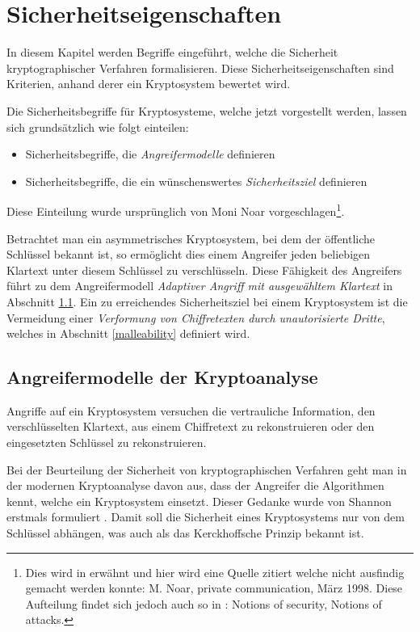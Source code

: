 \chapter{Sicherheitseigenschaften}
\label{SK}

In diesem Kapitel werden Begriffe eingeführt, welche die Sicherheit kryptographischer Verfahren formalisieren. Diese Sicherheitseigenschaften sind Kriterien, anhand derer ein Kryptosystem bewertet wird.

Die Sicherheitsbegriffe für Kryptosysteme, welche jetzt vorgestellt werden, lassen sich grundsätzlich wie folgt einteilen:

\begin{itemize}
	\item Sicherheitsbegriffe, die \textit{Angreifermodelle} definieren 
	\item Sicherheitsbegriffe, die ein wünschenswertes \textit{Sicherheitsziel} definieren
\end{itemize}

Diese Einteilung wurde ursprünglich von Moni Noar vorgeschlagen\footnote{Dies wird in \cite{bellare1998relations} erwähnt und hier wird eine Quelle zitiert welche nicht ausfindig gemacht werden konnte: M. Noar, private communication, März 1998. Diese Aufteilung findet sich jedoch auch so in \cite[p.289]{smart2003}: Notions of security, Notions of attacks.}.

Betrachtet man ein asymmetrisches Kryptosystem, bei dem der öffentliche Schlüssel bekannt ist, so ermöglicht dies einem Angreifer jeden beliebigen Klartext unter diesem Schlüssel zu verschlüsseln. Diese Fähigkeit des Angreifers führt zu dem Angreifermodell \textit{Adaptiver Angriff mit ausgewähltem Klartext} in Abschnitt \ref{angreifermodelle}. Ein zu erreichendes Sicherheitsziel bei einem Kryptosystem ist die Vermeidung einer \textit{Verformung von Chiffretexten durch unautorisierte Dritte}, welches in Abschnitt \ref{malleability} definiert wird.

\section{Angreifermodelle der Kryptoanalyse}
\label{angreifermodelle}

Angriffe auf ein Kryptosystem versuchen die vertrauliche Information, den verschlüsselten Klartext, aus einem Chiffretext zu rekonstruieren oder den eingesetzten Schlüssel zu rekonstruieren.

Bei der Beurteilung der Sicherheit von kryptographischen Verfahren geht man in der modernen Kryptoanalyse davon aus, dass der Angreifer die Algorithmen kennt, welche ein Kryptosystem einsetzt. Dieser Gedanke wurde von Shannon erstmals formuliert \cite[p.662]{shannon1949communication}. Damit soll die Sicherheit eines Kryptosystems nur von dem Schlüssel abhängen, was auch als das Kerckhoffsche Prinzip bekannt ist.

